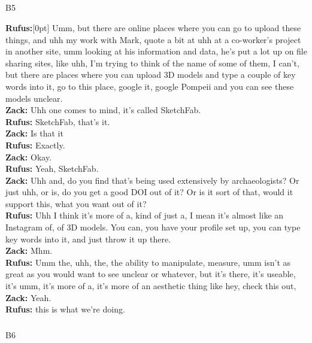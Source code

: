 \documentclass[
]{article}
\makeatletter
\let\oldsubparagraph\subparagraph
\renewcommand{\subparagraph}{
    \@ifstar
      \xxxSubParagraphStar
      \xxxSubParagraphNoStar
  }
\newcommand{\xxxSubParagraphStar}[1]{\oldsubparagraph*{#1}\mbox{}}
\newcommand{\xxxSubParagraphNoStar}[1]{\oldsubparagraph{#1}\mbox{}}
\newcommand{\paragraphnumber}[1]{\marginnote{\color{lightgray}\tiny{#1}}[0pt]}
\makeatother
\begin{document}
\subparagraph{B5}\label{sec-B5}

\textbf{Rufus:}\paragraphnumber{[119]} Umm, but there are online places
where you can go to upload these things, and uhh my work with Mark,
quote a bit at uhh at a co-worker's project in another site, umm looking
at his information and data, he's put a lot up on file sharing sites,
like uhh, I'm trying to think of the name of some of them, I can't, but
there are places where you can upload 3D models and type a couple of key
words into it, go to this place, google it, google Pompeii and you can
see these models unclear.\\
\textbf{Zack:} Uhh one comes to mind, it's called SketchFab.\\
\textbf{Rufus:} SketchFab, that's it.\\
\textbf{Zack:} Is that it\\
\textbf{Rufus:} Exactly.\\
\textbf{Zack:} Okay.\\
\textbf{Rufus:} Yeah, SketchFab.\\
\textbf{Zack:} Uhh and, do you find that's being used extensively by
archaeologists? Or just uhh, or is, do you get a good DOI out of it? Or
is it sort of that, would it support this, what you want out of it?\\
\textbf{Rufus:} Uhh I think it's more of a, kind of just a, I mean it's
almost like an Instagram of, of 3D models. You can, you have your
profile set up, you can type key words into it, and just throw it up
there.\\
\textbf{Zack:} Mhm.\\
\textbf{Rufus:} Umm the, uhh, the, the ability to manipulate, measure,
umm isn't as great as you would want to see unclear or whatever, but
it's there, it's useable, it's umm, it's more of a, it's more of an
aesthetic thing like hey, check this out,\\
\textbf{Zack:} Yeah.\\
\textbf{Rufus:} this is what we're doing.

\subparagraph{B6}\label{sec-B6}
\end{document}
